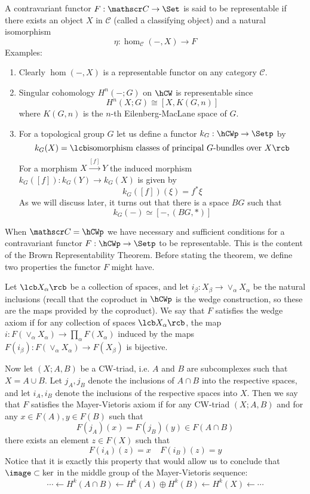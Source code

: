 A contravariant functor $F : \mathscr C \rightarrow \Set$ is said to be representable if there exists an object $X$ in $\mathscr C$ (called a classifying object) and a natural isomorphism
\[ \eta : \hom_{\mathscr C} (-, X) \longrightarrow F \]
Examples:
\begin{enumerate}
  \item Clearly $\hom(-,X)$ is a representable functor on any category $\mathscr C$.
  \item Singular cohomology $H^n(-;G)$ on $\hCW$ is representable since
  \[ H^n(X;G) \cong [X,K(G,n)] \]
  where $K(G,n)$ is the $n$-th Eilenberg-MacLane space of $G$. 
  \item For a topological group $G$ let us define a functor $k_G : \hCWp \rightarrow \Setp$ by
  \[ k_G(X) = \lcb \text{isomorphism classes of principal $G$-bundles over $X$} \rcb \]
  For a morphism $X \stackrel{[f]}{\longrightarrow} Y$ the induced morphism $k_G([f]) : k_G(Y) \rightarrow k_G(X)$ is given by
  \[ k_G([f])(\xi) = f^* \xi \]
  As we will discuss later, it turns out that there is a space $BG$ such that
  \[ k_G(-) \simeq [-,(BG,*)] \]
\end{enumerate}
When $\mathscr C = \hCWp$ we have necessary and sufficient conditions for a contravariant functor $F : \hCWp \rightarrow \Setp$ to be representable. This is the content of the Brown Representability Theorem. Before stating the theorem, we define two properties the functor $F$ might have. 

Let $\lcb X_\alpha \rcb$ be a collection of spaces, and let $i_\beta : X_\beta \rightarrow \vee_\alpha X_\alpha$ be the natural inclusions (recall that the coproduct in $\hCWp$ is the wedge construction, so these are the maps provided by the coproduct). We say that $F$ satisfies the wedge axiom if for any collection of spaces $\lcb X_\alpha \rcb$, the map $i : F(\vee_\alpha X_\alpha) \rightarrow \prod_\alpha F(X_\alpha)$ induced by the maps $F(i_\beta) : F(\vee_\alpha X_\alpha) \rightarrow F(X_\beta)$ is bijective.

Now let $(X;A,B)$ be a CW-triad, i.e. $A$ and $B$ are subcomplexes such that $X = A \cup B$. Let $j_A,j_B$ denote the inclusions of $A \cap B$ into the respective spaces, and let $i_A,i_B$ denote the inclusions of the respective spaces into $X$. Then we say that $F$ satisfies the Mayer-Vietoris axiom if for any CW-triad $(X;A,B)$ and for any $x \in F(A),y \in F(B)$ such that
\[ F(j_A)(x) = F(j_B)(y) \in F(A \cap B) \]
there exists an element $z \in F(X)$ such that
\[ F(i_A)(z) = x \ \ \ \ \ F(i_B)(z) = y \]
Notice that it is exactly this property that would allow us to conclude that $\image \subset \ker$ in the middle group of the Mayer-Vietoris sequence:
\[ \cdots \longleftarrow H^k(A \cap B) \longleftarrow H^k(A) \oplus H^k(B) \longleftarrow H^k(X) \longleftarrow \cdots \]

